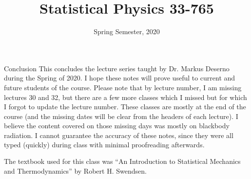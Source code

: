 \documentclass[a4paper, twoside]{report}
\title{Statistical Physics 33-765}
\date{Spring Semester, 2020}
\begin{document}
\maketitle
\tableofcontents






































\begin{note}{Conclusion}
    This concludes the lecture series taught by Dr. Markus Deserno during the Spring of 2020. I hope these notes will prove useful to current and future students of the course. Please note that by lecture number, I am missing lectures 30 and 32, but there are a few more classes which I missed but for which I forgot to update the lecture number. These classes are mostly at the end of the course (and the missing dates will be clear from the headers of each lecture). I believe the content covered on those missing days was mostly on blackbody radiation. I cannot guarantee the accuracy of these notes, since they were all typed (quickly) during class with minimal proofreading afterwards.

    The textbook used for this class was ``An Introduction to Statistical Mechanics and Thermodynamics'' by Robert H. Swendsen.
\end{note}
\end{document}
